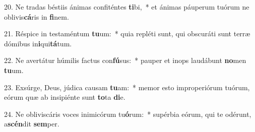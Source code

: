 20. Ne tradas béstiis ánimas confiténtes \textbf{ti}bi,~*  et ánimas páuperum tuórum ne oblivis\textbf{cá}ris in \textbf{fi}nem.\

21. Réspice in testaméntum \textbf{tu}um:~*  quia repléti sunt, qui obscuráti sunt terræ dómibus in\textbf{i}qui\textbf{tá}tum.\

22. Ne avertátur húmilis factus con\textbf{fú}sus:~*  pauper et inops laudábunt \textbf{no}men \textbf{tu}um.\

23. Exsúrge, Deus, júdica causam \textbf{tu}am:~*  memor esto improperiórum tuórum, eórum quæ ab insipiénte sunt \textbf{to}ta \textbf{di}e.\

24. Ne obliviscáris voces inimicórum tu\textbf{ó}rum:~*  supérbia eórum, qui te odérunt, a\textbf{scén}dit \textbf{sem}per.\

